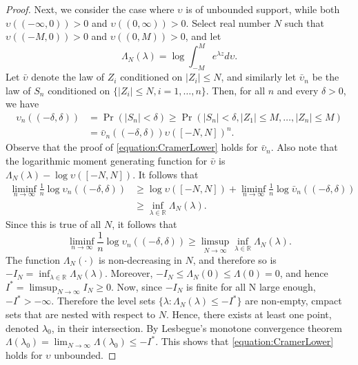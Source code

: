 \begin{proof}
Next, we consider the case where $\upsilon$ is of unbounded support, while both $\upsilon((- \infty,0)) > 0$ and $\upsilon ((0, \infty)) > 0$.
Select real number $N$ such that $\upsilon((- M,0)) > 0$ and $\upsilon ((0, M)) > 0$, and let
\begin{equation*}
\Lambda_N (\lambda) = \log \int_{- M}^M e^{\lambda z} d \upsilon .
\end{equation*}
Let $\bar{\upsilon}$ denote the law of $Z_i$ conditioned on $|Z_i| \leq N$, and similarly let $\bar{\upsilon}_n$ be the law of $S_n$ conditioned on $\{ |Z_i| \leq N , i = 1, \ldots, n \}$.
Then, for all $n$ and every $\delta > 0$, we have
\begin{equation*}
\begin{split}
\upsilon_n ((- \delta, \delta))
&= \Pr (|S_n| < \delta)
\geq \Pr (|S_n| < \delta, |Z_1| \leq M, \ldots, |Z_n| \leq M) \\
&= \bar{\upsilon}_n ((- \delta, \delta)) \upsilon([-N, N])^n .
\end{split}
\end{equation*}
Observe that the proof of \eqref{equation:CramerLower} holds for $\bar{\upsilon}_n$.
Also note that the logarithmic moment generating function for $\bar{\upsilon}$ is $\Lambda_N(\lambda) - \log \upsilon ([-N,N])$.
It follows that
\begin{equation*}
\begin{split}
\liminf_{n \rightarrow \infty} \frac{1}{n} \log \upsilon_n ((- \delta, \delta))
&\geq \log \upsilon([-N,N]) + \liminf_{n \rightarrow \infty}
\frac{1}{n} \log \bar{\upsilon}_n ((- \delta, \delta)) \\
&\geq \inf_{\lambda \in \mathbb{R}} \Lambda_{N} (\lambda) .
\end{split}
\end{equation*}
Since this is true of all $N$, it follows that
\begin{equation*}
\liminf_{n \rightarrow \infty} \frac{1}{n} \log \upsilon_n ((- \delta, \delta))
\geq \limsup_{N \rightarrow \infty}
\inf_{\lambda \in \mathbb{R}} \Lambda_{N} (\lambda) .
\end{equation*}
The function $\Lambda_N (\cdot)$ is non-decreasing in $N$, and therefore so is $- I_N = \inf_{\lambda \in \mathbb{R}} \Lambda_N (\lambda)$.
Moreover, $-I_N \leq \Lambda_N(0) \leq \Lambda (0) = 0$, and hence $I^* = \limsup_{N \rightarrow \infty} I_N \geq 0$.
Now, since $-I_N$ is finite for all N large enough, $-I^* > - \infty$.
Therefore the level sets $\{ \lambda : \Lambda_N (\lambda) \leq - I^* \}$ are non-empty, cmpact sets that are nested with respect to $N$.
Hence, there exists at least one point, denoted $\lambda_0$, in their intersection.
By Lesbegue's monotone convergence theorem $\Lambda(\lambda_0) = \lim_{N \rightarrow \infty} \Lambda (\lambda_0) \leq -I^*$.
This shows that \eqref{equation:CramerLower} holds for $\upsilon$ unbounded.


\end{proof}
